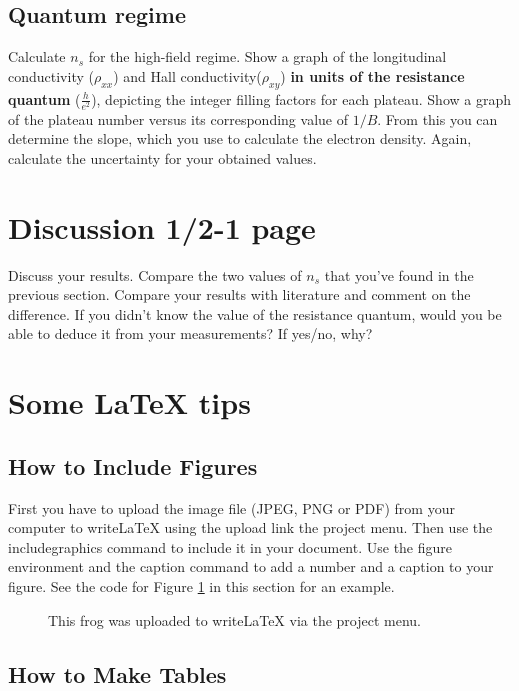 \documentclass[a4paper]{article}
\begin{document}
      \subsection{Quantum regime}
      Calculate $n_{s}$ for the high-field regime.
      Show a graph of the longitudinal conductivity ($\rho_{xx}$) and Hall conductivity($\rho_{xy}$) \textbf{in units of the resistance quantum} ($\frac{h}{e^{2}}$), depicting the integer filling factors for each plateau.
      Show a graph of the plateau number versus its corresponding value of $1/B$. From this you can determine the slope, which you use to calculate the electron density.
      Again, calculate the uncertainty for your obtained values.
      
      \section{Discussion 1/2-1 page}
      Discuss your results. Compare the two values of $n_{s}$ that you've found in the previous section. Compare your results with literature and comment on the difference. If you didn't know the value of the resistance quantum, would you be able to deduce it from your measurements? If yes/no, why?
      
      \newpage
      \section{Some LaTeX tips}
      \label{sec:latex}
      \subsection{How to Include Figures}
      
      First you have to upload the image file (JPEG, PNG or PDF) from your computer to writeLaTeX using the upload link the project menu. Then use the includegraphics command to include it in your document. Use the figure environment and the caption command to add a number and a caption to your figure. See the code for Figure \ref{fig:frog} in this section for an example.
      
      \begin{figure}
      \centering
      \caption{\label{fig:frog}This frog was uploaded to writeLaTeX via the project menu.}
      \end{figure}
      
      \subsection{How to Make Tables}
      
\end{document}
